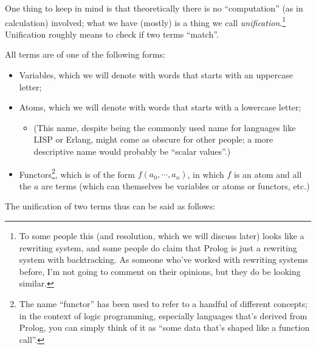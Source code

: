 One thing to keep in mind is that theoretically there is no ``computation'' (as in calculation) involved; what we have (mostly) is a thing we call \textit{unification}.\footnote{To some people this (and resolution, which we will discuss later) looks like a rewriting system, and some people do claim that Prolog is just a rewriting system with backtracking. As someone who've worked with rewriting systems before, I'm not going to comment on their opinions, but they do be looking similar.} Unification roughly means to check if two terms ``match''.

All terms are of one of the following forms:

\begin{itemize}
	\item Variables, which we will denote with words that starts with an uppercase letter;
	\item Atoms, which we will denote with words that starts with a lowercase letter;
	\begin{itemize}
		\item (This name, despite being the commonly used name for languages like LISP or Erlang, might come as obscure for other people; a more descriptive name would probably be ``scalar values''.)
	\end{itemize}
	\item Functors\footnote{The name ``functor'' has been used to refer to a handful of different concepts; in the context of logic programming, especially languages that's derived from Prolog, you can simply think of it as ``some data that's shaped like a function call''.}, which is of the form \(f(a_0,\cdots,a_n)\), in which \(f\) is an atom and all the \(a\) are terms (which can themselves be variables or atoms or functors, etc.)
\end{itemize}

The unification of two terms thus can be said as follows:

